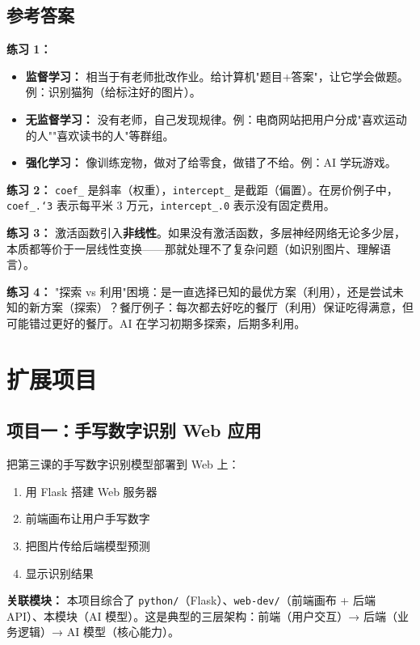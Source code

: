 \documentclass[a4paper,12pt]{ctexart}
\begin{document}
\subsection*{参考答案}

\textbf{练习 1：}
\begin{itemize}
  \item \textbf{监督学习：} 相当于有老师批改作业。给计算机"题目+答案"，让它学会做题。例：识别猫狗（给标注好的图片）。
  \item \textbf{无监督学习：} 没有老师，自己发现规律。例：电商网站把用户分成"喜欢运动的人""喜欢读书的人"等群组。
  \item \textbf{强化学习：} 像训练宠物，做对了给零食，做错了不给。例：AI 学玩游戏。
\end{itemize}

\textbf{练习 2：} \texttt{coef\_} 是斜率（权重），\texttt{intercept\_} 是截距（偏置）。在房价例子中，\texttt{coef\_.`3} 表示每平米 3 万元，\texttt{intercept\_.0} 表示没有固定费用。

\textbf{练习 3：} 激活函数引入\textbf{非线性}。如果没有激活函数，多层神经网络无论多少层，本质都等价于一层线性变换——那就处理不了复杂问题（如识别图片、理解语言）。

\textbf{练习 4：} "探索 vs 利用"困境：是一直选择已知的最优方案（利用），还是尝试未知的新方案（探索）？餐厅例子：每次都去好吃的餐厅（利用）保证吃得满意，但可能错过更好的餐厅。AI 在学习初期多探索，后期多利用。

\section*{扩展项目}

\subsection*{项目一：手写数字识别 Web 应用}

把第三课的手写数字识别模型部署到 Web 上：

\begin{enumerate}
  \item 用 Flask 搭建 Web 服务器
  \item 前端画布让用户手写数字
  \item 把图片传给后端模型预测
  \item 显示识别结果
\end{enumerate}

\textbf{关联模块：} 本项目综合了 \texttt{python/}（Flask）、\texttt{web-dev/}（前端画布 + 后端 API）、本模块（AI 模型）。这是典型的三层架构：前端（用户交互）→ 后端（业务逻辑）→ AI 模型（核心能力）。
\end{document}
